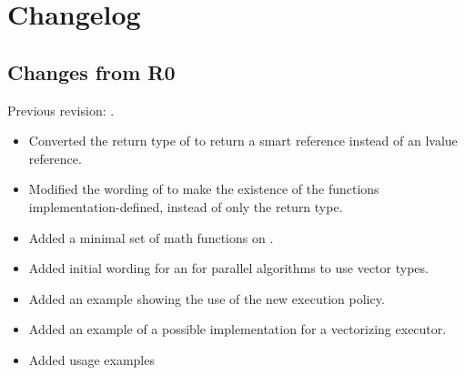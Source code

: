 \section{Changelog}
\subsection{Changes from R0}
Previous revision: \citep{P0214R0}.
\begin{itemize}
  \chck Extended the  tag types with a  tag to handle arbitrarily sized vectors (\ref{sec:datapar.abi}).
  \chck Converted  into a non-member trait (\ref{sec:datapar.traits}).
  \chck Extended implicit conversions to handle \fixedsizeN (\ref{sec:datapar.ctor}).
  \chck Extended binary operators to convert correctly with \fixedsizeN (\ref{sec:datapar.binary}).
  \chck Dropped the section on “\datapar logical operators”. Added a note that the omission is deliberate (\ref{sec:datapar.logical}).
  \chck Added logical and bitwise operators to \mask (\ref{sec:mask.binary}).
  \chck Modified \mask compares to work better with implicit conversions (\ref{sec:mask.comparison}).
  \chck Modified  to support different Abi tags on the \mask and \datapar arguments (\ref{sec:mask.where}).
  \chck Converted the load functions to non-member functions.
    SG1 asked for guidance from LEWG whether a load-expression or a template parameter to load is more appropriate.
  \chck Converted the store functions to non-member functions to be consistent with the load functions.
  \chck Added a note about masked stores not invoking out-of-bounds accesses for masked-off elements of the vector.
  \item Converted the return type of \datapar{} to return a smart reference instead of an lvalue reference.
  \item Modified the wording of  to make the existence of the functions implementation-defined, instead of only the return type.
  \item Added a minimal set of math functions on \datapar.
  \item Added initial wording for an  for parallel algorithms to use vector types.
  \item Added an example showing the use of the new execution policy.
  \item Added an example of a possible  implementation for a vectorizing executor.
  \item Added usage examples
\end{itemize}





